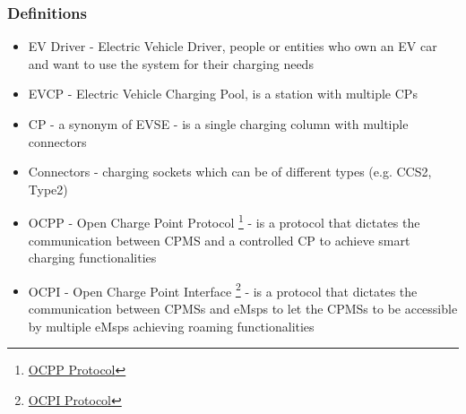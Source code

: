 \subsubsection{Definitions}
\begin{itemize}
    \item EV Driver - Electric Vehicle Driver, people or entities who own an EV car and want to use the system for their charging needs
    \item EVCP - Electric Vehicle Charging Pool, is a station with multiple CPs
    \item CP - a synonym of EVSE - is a single charging column with multiple connectors
    \item Connectors - charging sockets which can be of different types (e.g. CCS2, Type2)
    \item OCPP - Open Charge Point Protocol \footnote{\href{https://www.openchargealliance.org/protocols/ocpp-201/}{OCPP Protocol}} - is a protocol that dictates the communication between CPMS and a controlled CP to achieve smart charging functionalities
    \item OCPI - Open Charge Point Interface \footnote{\href{https://evroaming.org/ocpi-background/}{OCPI Protocol}} - is a protocol that dictates the communication between CPMSs and eMsps to let the CPMSs to be accessible by multiple eMsps achieving roaming functionalities
\end{itemize}

